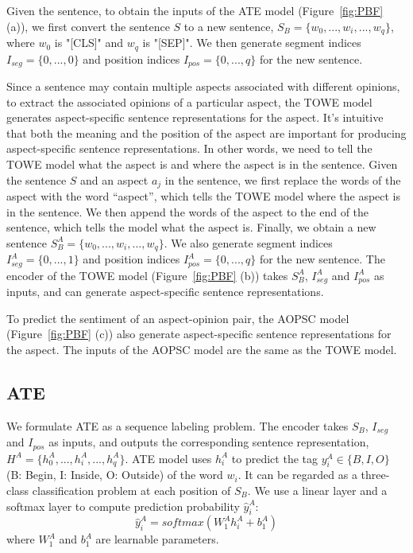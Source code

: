 \documentclass[11pt]{article}
\begin{document}
Given the sentence, to obtain the inputs of the ATE model (Figure~\ref{fig:PBF} (a)), we first convert the sentence $S$ to a new sentence, $S_B=\{w_0,...,w_i,...,w_q\}$, where $w_0$ is "[CLS]" and $w_q$ is "[SEP]". We then generate segment indices $I_{seg}=\{0, ...,0\}$ and position indices $I_{pos}=\{0, ..., q\}$ for the new sentence. 

Since a sentence may contain multiple aspects associated with different opinions, to extract the associated opinions of a particular aspect, the TOWE model generates aspect-specific sentence representations for the aspect. It's intuitive that both the meaning and the position of the aspect are important for producing aspect-specific sentence representations. In other words, we need to tell the TOWE model what the aspect is and where the aspect is in the sentence. Given the sentence $S$ and an aspect $a_j$ in the sentence, we first replace the words of the aspect with the word ``aspect'', which tells the TOWE model where the aspect is in the sentence. We then append the words of the aspect to the end of the sentence, which tells the model what the aspect is. Finally, we obtain a new sentence $S^A_B=\{w_0,...,w_i,...,w_q\}$. We also generate segment indices $I^A_{seg}=\{0, ...,1\}$ and position indices $I^A_{pos}=\{0, ..., q\}$ for the new sentence. The encoder of the TOWE model (Figure~\ref{fig:PBF} (b)) takes $S^A_B$, $I^A_{seg}$ and $I^A_{pos}$ as inputs, and can generate aspect-specific sentence representations. 

To predict the sentiment of an aspect-opinion pair, the AOPSC model (Figure~\ref{fig:PBF} (c)) also generate aspect-specific sentence representations for the aspect. The inputs of the AOPSC model are the same as the TOWE model.

\subsection{ATE}
We formulate ATE as a sequence labeling problem. The encoder takes $S_B$, $I_{seg}$ and $I_{pos}$ as inputs, and outputs the corresponding sentence representation, $H^A=\{h^A_0,...,h^A_i,...,h^A_q\}$. ATE model uses $h^A_i$ to predict the tag $y^A_i \in \{B, I, O\}$ (B: Begin, I: Inside, O: Outside) of the word $w_i$. It can be regarded as a three-class classification problem at
each position of $S_B$. We use a linear layer and a softmax layer to compute prediction probability $\hat{y}^A_i$:
\begin{equation}
	\hat{y}^A_i=softmax(W^A_1h^A_i + b^A_1)
\end{equation}
where $W^A_1$ and $b^A_1$ are learnable parameters.
\end{document}
